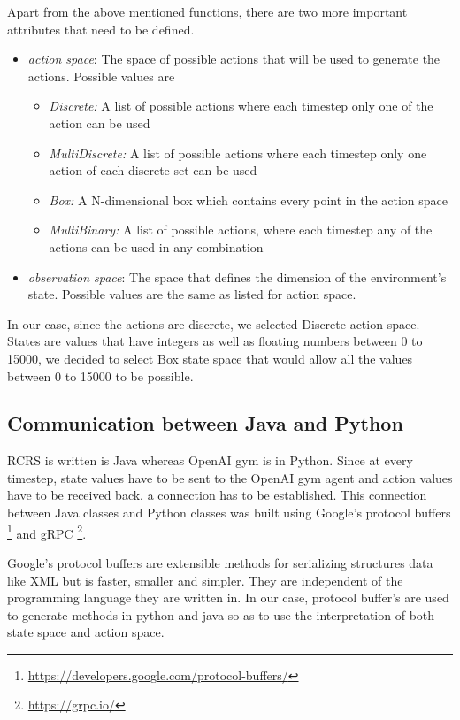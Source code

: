 \documentclass[12pt]{report}
\begin{document}
Apart from the above mentioned functions, there are two more important attributes that need to be defined. 

\begin{itemize}
    \item \emph{action space}: The space of possible actions that will be used to generate the actions. Possible values are 
    \begin{itemize}
        \item \emph{Discrete:} A list of possible actions where each timestep only one of the action can be used
        \item \emph{MultiDiscrete:} A list of possible actions where each timestep only one action of each discrete set can be used
        \item \emph{Box:} A N-dimensional box which contains every point in the action space
        \item \emph{MultiBinary:} A list of possible actions, where each timestep any of the actions can be used in any combination
    \end{itemize}
    
    \item \emph{observation space}: The space that defines the dimension of the environment's state. Possible values are the same as listed for action space. 
\end{itemize}

In our case, since the actions are discrete, we selected Discrete action space. States are values that have integers as well as floating numbers between 0 to 15000, we decided to select Box state space that would allow all the values between 0 to 15000 to be possible. 

\subsection{Communication between Java and Python} \label{CommunicationJavaPython}

RCRS is written is Java whereas OpenAI gym is in Python. Since at every timestep, state values have to be sent to the OpenAI gym agent and action values have to be received back, a connection has to be established. This connection between Java classes and Python classes was built using Google's protocol buffers \footnote{\url{https://developers.google.com/protocol-buffers/}}  and gRPC \footnote{\url{https://grpc.io/}}. 

Google's protocol buffers are extensible methods for serializing structures data like XML but is faster, smaller and simpler. They are independent of the programming language they are written in. In our case, protocol buffer's are used to generate methods in python and java so as to use the interpretation of both state space and action space. 
\end{document}

